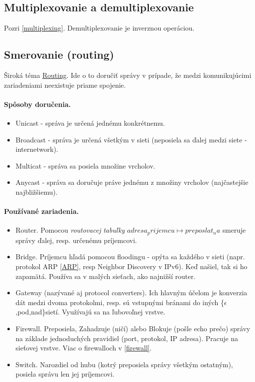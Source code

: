 \documentclass[10pt,a4paper]{article}
\begin{document}
\subsection{Multiplexovanie a demultiplexovanie}  
Pozri \ref{multiplexing}. Demultiplexovanie je inverznou operáciou. 

\subsection{Smerovanie (routing)}     
Široká téma \href{http://en.wikipedia.org/wiki/Routing}{Routing}. 
Ide o to doručiť správy v prípade, že medzi komunikujúcimi zariadeniami neexistuje priame spojenie. 

\paragraph{Spôsoby doručenia.}
\begin{itemize}
\item Unicast - správa je určená jednému konkrétnemu.         
\item Broadcast - správa je určená všetkým v sieti (neposiela sa ďalej medzi siete - internetwork).
\item Multicat - správa sa posiela množine vrcholov. 
\item Anycast - správa sa doručuje práve jednému z množiny vrcholov (najčastejšie najbližšiemu).
\end{itemize}                               
                
\paragraph{Používané zariadenia.}
\begin{itemize}
\item Router. Pomocou \emph{routovacej tabuľky} $adresa_prijemcu \mapsto preposlat_na$ smeruje správy ďalej, resp. určenému príjemcovi.         
\item Bridge. Príjemcu hľadá pomocou floodingu - opýta sa každého v sieti (napr. protokol ARP \ref{ARP}, resp Neighbor Discovery v IPv6). Keď našiel, tak si ho zapamätá. Používa sa v malých sieťach, ako najnižší router.  
\item Gateway (nazývané aj protocol converters). Ich hlavným účelom je konverzia dát medzi dvoma protokolmi, resp. sú vstupnými bránami do iných \{$\epsilon$,pod,nad\}sietí. Využívajú sa na ľubovoľnej vrstve. 
\item Firewall. Preposiela, Zahadzuje (ničí) alebo Blokuje (pošle echo prečo) správy na základe jednoduchých pravidiel (port, protokol, IP adresa). Pracuje na sieťovej vrstve. Viac o firewalloch v \ref{firewall}. 
\item Switch. Narozdiel od hubu (kotrý preposiela správy všetkým ostatným), posiela správu len jej príjemcovi. 
\end{itemize}  
\end{document}
